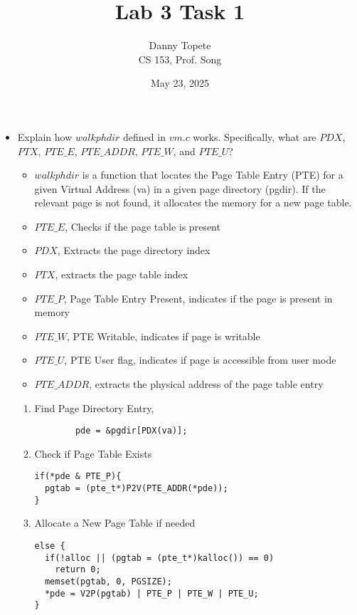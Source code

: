 \documentclass{article}
\title{Lab 3 Task 1}
\date{May 23, 2025}
\author{Danny Topete\\ CS 153, Prof. Song}
\begin{document}
\maketitle

\begin{itemize}
  \item Explain how $walkphdir$ defined in $vm.c$ works.
    Specifically, what are $PDX$, $PTX$, $PTE\_E$, $PTE\_ADDR$,
    $PTE\_W$, and $PTE\_U$?
    \begin{itemize}
      \item $walkphdir$ is a function that locates the Page Table Entry (PTE)
        for a given Virtual Address (va) in a given page
        directory (pgdir).
        If the relevant page is not found, it allocates the memory for a
        new page table.
      \item $PTE\_E$, Checks if the page table is present
      \item $PDX$, Extracts the page directory index
      \item $PTX$, extracts the page table index
      \item $PTE\_P$, Page Table Entry Present, indicates if the page is present in memory
      \item $PTE\_W$, PTE Writable, indicates if page is writable
      \item $PTE\_U$, PTE User flag, indicates if page is accessible from user mode
      \item $PTE\_ADDR$, extracts the physical address of the page table entry
    \end{itemize}

    \begin{enumerate}
      \item Find Page Directory Entry,

        \begin{verbatim}
        pde = &pgdir[PDX(va)];
        \end{verbatim}

      \item Check if Page Table Exists

        \begin{verbatim}
if(*pde & PTE_P){
  pgtab = (pte_t*)P2V(PTE_ADDR(*pde));
}
        \end{verbatim}

      \item Allocate a New Page Table if needed
        \begin{verbatim}
else {
  if(!alloc || (pgtab = (pte_t*)kalloc()) == 0)
    return 0;
  memset(pgtab, 0, PGSIZE);
  *pde = V2P(pgtab) | PTE_P | PTE_W | PTE_U;
}        \end{verbatim}


\end{enumerate}
\end{itemize}
\end{document}
